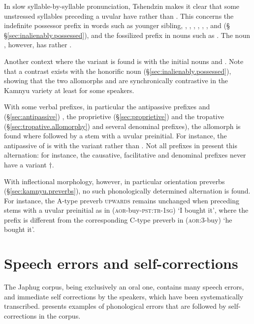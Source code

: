 In slow syllable-by-syllable pronunciation, Tshendzin makes it clear that some unstressed syllables preceding a uvular have  rather than . This concerns the indefinite possessor prefix in words such as  {younger sibling}, , , , , , ,  and  (§ §\ref{sec:inalienably.possessed}), and the fossilized prefix in nouns such as . The noun , however, has  rather .

Another context where the variant  is found is with the  initial nouns  and . Note that a contrast exists with the honorific noun  (§\ref{sec:inalienably.possessed}), showing that the two allomorphs  and  are synchronically contrastive in the Kamnyu variety at least for some speakers.

With some verbal prefixes, in particular the antipassive prefixes  and  (§\ref{sec:antipassive}) , the proprietive  (§\ref{sec:proprietive}) and the tropative  (§\ref{sec:tropative.allomorphy}) and several denominal prefixes), the  allomorph is found where followed by a stem with a uvular preinitial. For instance, the antipassive of  is  with the variant  rather than . Not all prefixes in  present this alternation: for instance, the causative, facilitative and denominal prefixes  never have a variant $\dagger$.

With inflectional morphology, however, in particular orientation preverbs (§\ref{sec:kamnyu.preverbs}), no such phonologically determined alternation is found. For instance, the A-type preverb  \textsc{upwards} remains unchanged when preceding stems with a uvular preinitial as in  (\textsc{aor}-buy-\textsc{pst}:\textsc{tr}-\textsc{1sg}) `I bought it', where the prefix  is different from the corresponding C-type preverb  in  (\textsc{aor}:3\flobv{}-buy) `he bought it'.

\section{Speech errors and self-corrections} \label{sec:self.corrections}
The Japhug corpus, being exclusively an oral one, contains many speech errors, and immediate self corrections by the speakers, which have been systematically transcribed.  presents examples of phonological errors that are followed by self-corrections in the corpus.

